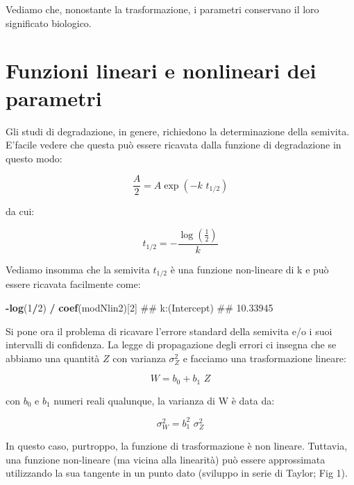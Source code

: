 \documentclass[a4paper,12pt,oneside]{book}
\newenvironment{Shaded}{\begin{snugshade}}{\end{snugshade}}
\newcommand{\KeywordTok}[1]{\textcolor[rgb]{0.13,0.29,0.53}{\textbf{#1}}}
\newcommand{\DecValTok}[1]{\textcolor[rgb]{0.00,0.00,0.81}{#1}}
\newcommand{\StringTok}[1]{\textcolor[rgb]{0.31,0.60,0.02}{#1}}
\newcommand{\OperatorTok}[1]{\textcolor[rgb]{0.81,0.36,0.00}{\textbf{#1}}}
\newcommand{\NormalTok}[1]{#1}
\theoremstyle{definition}
\theoremstyle{definition}
\theoremstyle{definition}
\theoremstyle{remark}
\begin{document}
Vediamo che, nonostante la trasformazione, i parametri conservano il
loro significato biologico.

\section{Funzioni lineari e nonlineari dei
parametri}\label{funzioni-lineari-e-nonlineari-dei-parametri}

Gli studi di degradazione, in genere, richiedono la determinazione della
semivita. E'facile vedere che questa può essere ricavata dalla funzione
di degradazione in questo modo:

\[ \frac{A}{2} = A \exp ( - k \,\, t_{1/2}) \]

da cui:

\[ t_{1/2} = - \frac{ \log \left( {\frac{1}{2}} \right) }{k}\]

Vediamo insomma che la semivita \(t_{1/2}\) è una funzione non-lineare
di k e può essere ricavata facilmente come:

\begin{Shaded}
\begin{Highlighting}[]
\OperatorTok{-}\KeywordTok{log}\NormalTok{(}\DecValTok{1}\OperatorTok{/}\DecValTok{2}\NormalTok{) }\OperatorTok{/}\StringTok{ }\KeywordTok{coef}\NormalTok{(modNlin2)[}\DecValTok{2}\NormalTok{]}
\NormalTok{## k:(Intercept) }
\NormalTok{##      10.33945}
\end{Highlighting}
\end{Shaded}

Si pone ora il problema di ricavare l'errore standard della semivita e/o
i suoi intervalli di confidenza. La legge di propagazione degli errori
ci insegna che se abbiamo una quantità \(Z\) con varianza \(\sigma^2_Z\)
e facciamo una trasformazione lineare:

\[W = b_0 + b_1 \,\, Z\]

con \(b_0\) e \(b_1\) numeri reali qualunque, la varianza di W è data
da:

\[\sigma^2_W = b_1^2 \,\, \sigma^2_Z\]

In questo caso, purtroppo, la funzione di trasformazione è non lineare.
Tuttavia, una funzione non-lineare (ma vicina alla linearità) può essere
approssimata utilizzando la sua tangente in un punto dato (sviluppo in
serie di Taylor; Fig 1).
\end{document}
